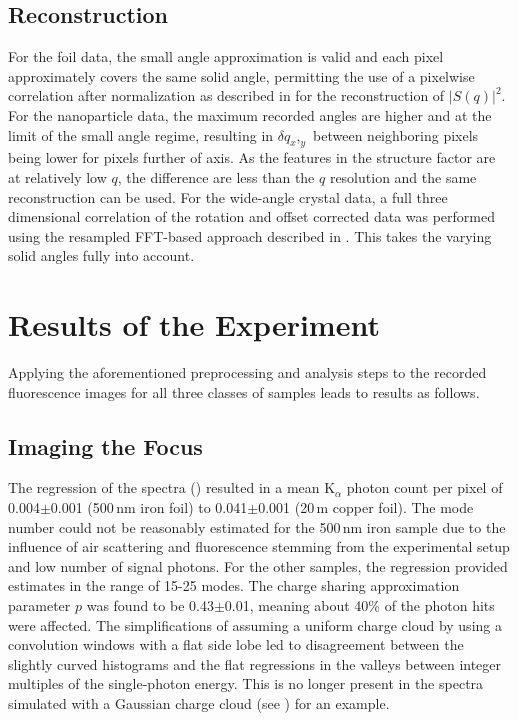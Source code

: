 \subsection{Reconstruction}
For the foil data, the small angle approximation is valid and each pixel approximately covers the  same solid angle, permitting the use of a pixelwise correlation after normalization as described in  for the reconstruction of $|S(q)|^2$. For the nanoparticle data, the maximum recorded angles are higher and at the limit of the small angle regime, resulting in $\delta q_x,_y$ between neighboring pixels being lower for pixels further of axis. As the features in the structure factor are at relatively low $q$, the difference are less than the $q$ resolution and the same reconstruction can be used.
 For the wide-angle crystal data, a full three dimensional correlation of the rotation and offset corrected data was performed using the resampled FFT-based approach described in . This takes the varying solid angles fully into account.


\section{Results of the Experiment}
Applying the aforementioned preprocessing and analysis steps to the recorded fluorescence images for all three classes of samples leads to results as follows. 
\subsection{Imaging the Focus}

The regression of the spectra () resulted in a mean K$_{\alpha}$ photon count per pixel of 0.004$\pm$0.001 (500\,nm iron foil) to 0.041$\pm$0.001 (20\,\textmu m copper foil). The mode number could not be reasonably estimated for the 500\,nm iron sample due to the influence of air scattering and fluorescence stemming from the experimental setup and low number of signal photons. For the other samples, the regression provided estimates in the range of 15-25 modes. The charge sharing approximation parameter $p$ was found to be 0.43$\pm$0.01, meaning about 40\% of the photon hits were affected. The simplifications of assuming a uniform charge cloud by using a convolution windows with a flat side lobe led to disagreement between the slightly curved histograms and the flat regressions in the valleys between integer multiples of the single-photon energy. This is no longer present in the spectra simulated with a Gaussian charge cloud (see ) for an example.

